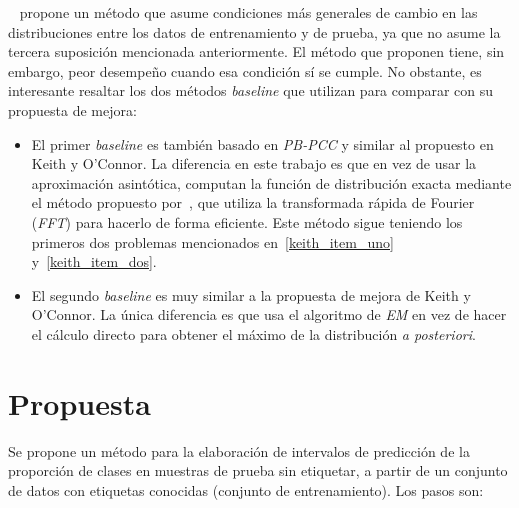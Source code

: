 ~\citet{denham2021gain} propone un método que asume condiciones más generales de
cambio en las distribuciones entre los datos de entrenamiento y de prueba, ya
que no asume la tercera suposición mencionada anteriormente. El método que
proponen tiene, sin embargo, peor desempeño cuando esa condición sí se cumple.
No obstante, es interesante resaltar los dos métodos {\it baseline\/} que
utilizan para comparar con su propuesta de mejora:

\begin{itemize}
    \item El primer {\it baseline\/} es también basado en {\it PB-PCC\/} y
    similar al propuesto en Keith y O'Connor. La diferencia en este trabajo es
    que en vez de usar la aproximación asintótica, computan la función de
    distribución exacta mediante el método propuesto
    por~\citet{hong2013computing}, que utiliza la transformada rápida de Fourier
    ({\it FFT\/}) para hacerlo de forma eficiente. Este método sigue teniendo
    los primeros dos problemas mencionados en~\ref{keith_item_uno}
    y~\ref{keith_item_dos}.
    \item El segundo {\it baseline\/} es muy similar a la propuesta de mejora de
    Keith y O'Connor. La única diferencia es que usa el algoritmo de {\it EM\/}
    en vez de hacer el cálculo directo para obtener el máximo de la distribución
    {\it a posteriori}.
\end{itemize}

\section{Propuesta}

Se propone un método para la elaboración de intervalos de predicción de la
proporción de clases en muestras de prueba sin etiquetar, a partir de un
conjunto de datos con etiquetas conocidas (conjunto de entrenamiento). Los pasos
son:

